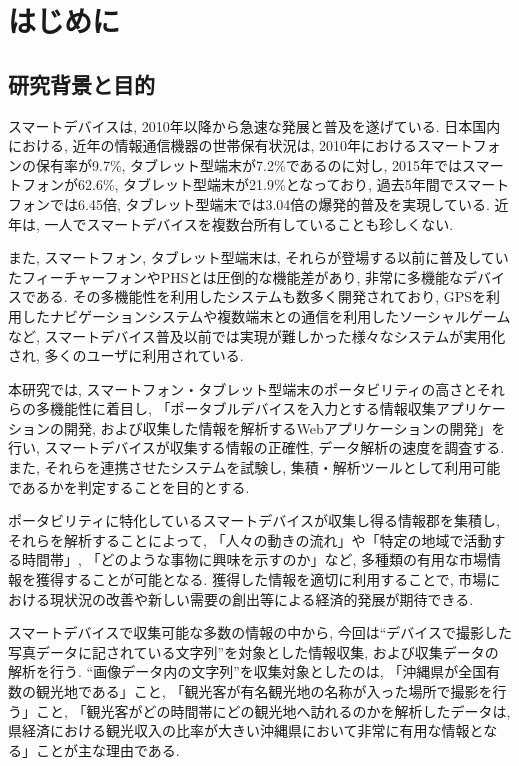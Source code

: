 \chapter{はじめに}
\label{chap:introduction}

\section{研究背景と目的}
スマートデバイスは, 2010年以降から急速な発展と普及を遂げている.
日本国内における, 近年の情報通信機器の世帯保有状況は, 2010年におけるスマートフォンの保有率が9.7\%, タブレット型端末が7.2\%であるのに対し, 2015年ではスマートフォンが62.6\%, タブレット型端末が21.9\%となっており, 過去5年間でスマートフォンでは6.45倍, タブレット型端末では3.04倍の爆発的普及を実現している.
近年は, 一人でスマートデバイスを複数台所有していることも珍しくない.

また, スマートフォン, タブレット型端末は, それらが登場する以前に普及していたフィーチャーフォンやPHSとは圧倒的な機能差があり, 非常に多機能なデバイスである.
その多機能性を利用したシステムも数多く開発されており, GPSを利用したナビゲーションシステムや複数端末との通信を利用したソーシャルゲームなど, スマートデバイス普及以前では実現が難しかった様々なシステムが実用化され, 多くのユーザに利用されている.

本研究では, スマートフォン・タブレット型端末のポータビリティの高さとそれらの多機能性に着目し, 「ポータブルデバイスを入力とする情報収集アプリケーションの開発, および収集した情報を解析するWebアプリケーションの開発」を行い, スマートデバイスが収集する情報の正確性, データ解析の速度を調査する.
また, それらを連携させたシステムを試験し, 集積・解析ツールとして利用可能であるかを判定することを目的とする.

ポータビリティに特化しているスマートデバイスが収集し得る情報郡を集積し, それらを解析することによって, 「人々の動きの流れ」や「特定の地域で活動する時間帯」, 「どのような事物に興味を示すのか」など, 多種類の有用な市場情報を獲得することが可能となる.
獲得した情報を適切に利用することで, 市場における現状況の改善や新しい需要の創出等による経済的発展が期待できる.

スマートデバイスで収集可能な多数の情報の中から, 今回は“デバイスで撮影した写真データに記されている文字列”を対象とした情報収集, および収集データの解析を行う.
“画像データ内の文字列”を収集対象としたのは, 「沖縄県が全国有数の観光地である」こと, 「観光客が有名観光地の名称が入った場所で撮影を行う」こと, 「観光客がどの時間帯にどの観光地へ訪れるのかを解析したデータは, 県経済における観光収入の比率が大きい沖縄県において非常に有用な情報となる」ことが主な理由である.

